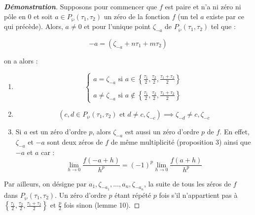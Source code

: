 \documentclass[12pt]{article}
\begin{document}
                    \begin{proof}[\textbf{Démonstration}]
                    Supposons pour commencer que \(f\) est paire et n'a ni zéro ni pôle en 0 et soit \(a \in P_{\wp}(\tau_1, \tau_2)\) un zéro de la fonction \(f\) (un tel \(a\) existe par ce qui précède). Alors, \(a \neq 0\) et pour l'unique point \(\zeta_{- a}\) de \(P_{\wp}(\tau_1, \tau_2)\) tel que :
                    
                    \[
                    -a = (\zeta_{- a} + n\tau_1 + m\tau_2)
                    \]
                    
                    on a alors :
                    
                    \begin{enumerate}
                        \item 
                        \[
                        \left\{
                        \begin{array}{ll}
                            a = \zeta_{-a} \text{ si } a \in \left\{\frac{\tau_1}{2}, \frac{\tau_2}{2}, \frac{\tau_1 + \tau_2}{2}\right\} \\ \\
                            a \neq \zeta_{-a} \text{ si } a \notin \left\{\frac{\tau_1}{2}, \frac{\tau_2}{2}, \frac{\tau_1 + \tau_2}{2}\right\}
                        \end{array}
                        \right.
                        \]
                        
                        \item 
                        \[
                        (c, d \in P_{\wp}(\tau_1, \tau_2) \text{ et } d \neq c, \zeta_{-c}) \implies \zeta_{-d} \neq c, \zeta_{-c}
                        \]
                        
                        \item Si \(a\) est un zéro d'ordre \(p\), alors \(\zeta_{-a}\) est aussi un zéro d'ordre \(p\) de \(f\). En effet, \(\zeta_{-a}\) et \(-a\) sont deux zéros de \(f\) de même multiplicité (proposition 3) ainsi que \(-a\) et \(a\) car :
                        \[
                        \lim_{h \to 0} \frac{f(-a + h)}{h^p} = (-1)^p \lim_{h \to 0} \frac{f(a + h)}{h^p}
                        \]
                    \end{enumerate}
                    
                    Par ailleurs, on désigne par \(a_1, \zeta_{-a_1}, \ldots, a_n, \zeta_{-a_n}\), la suite de tous les zéros de \(f\) dans \(P_{\wp}(\tau_1, \tau_2)\). Un zéro d'ordre \(p\) étant répété \(p\) fois s'il n'appartient pas à \(\left\{ \frac{\tau_1}{2}, \frac{\tau_2}{2}, \frac{\tau_1 + \tau_2}{2} \right\} \text{ et } \frac{p}{2}\) fois sinon (lemme 10).
                    

\end{proof}
\end{document}
